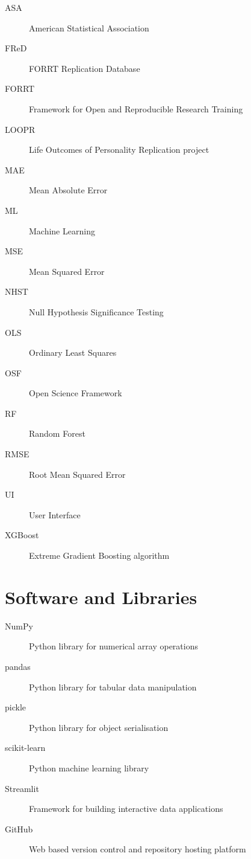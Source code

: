 \begin{description}
	
	\item[ASA] American Statistical Association
	
	\item[FReD] FORRT Replication Database
	
	\item[FORRT] Framework for Open and Reproducible Research Training
	
	\item[LOOPR] Life Outcomes of Personality Replication project
	
	\item[MAE] Mean Absolute Error
	
	\item[ML] Machine Learning
	
	\item[MSE] Mean Squared Error
	
	\item[NHST] Null Hypothesis Significance Testing
	
	\item[OLS] Ordinary Least Squares
	
	\item[OSF] Open Science Framework
	
	\item[RF] Random Forest
	
	\item[RMSE] Root Mean Squared Error
	
	\item[UI] User Interface
	
	\item[XGBoost] Extreme Gradient Boosting algorithm
	
\end{description}

\section*{Software and Libraries}

\begin{description}
	
	\item[NumPy] Python library for numerical array operations
	
	\item[pandas] Python library for tabular data manipulation
	
	\item[pickle] Python library for object serialisation
	
	\item[scikit-learn] Python machine learning library
	
	\item[Streamlit] Framework for building interactive data applications
	
	\item[GitHub] Web based version control and repository hosting platform
	
\end{description}